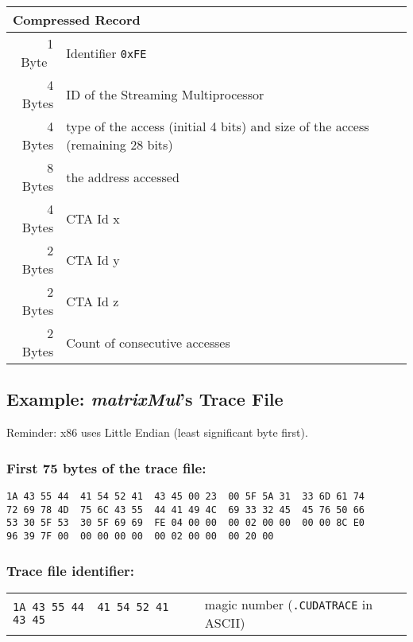 \documentclass{scrartcl}
\begin{document}
\bigskip

\begin{tabular}{r l}
\toprule
\multicolumn{2}{l}{\textbf{Compressed Record}} \\
\midrule
1 Byte~ & Identifier \lstinline[]$0xFE$ \\
4 Bytes & ID of the Streaming Multiprocessor \\
4 Bytes & type of the access (initial 4 bits) and size of the access (remaining 28 bits) \\
8 Bytes & the address accessed \\
4 Bytes & CTA Id x \\
2 Bytes & CTA Id y \\
2 Bytes & CTA Id z \\
2 Bytes & Count of consecutive accesses \\
\bottomrule
\end{tabular}


\newpage

\subsection{Example: \textit{matrixMul}’s Trace File}

Reminder: x86 uses Little Endian (least significant byte first).

\smallskip

\subsubsection*{First 75 bytes of the trace file:}
\begin{lstlisting}[numbers=none]
1A 43 55 44  41 54 52 41  43 45 00 23  00 5F 5A 31  33 6D 61 74
72 69 78 4D  75 6C 43 55  44 41 49 4C  69 33 32 45  45 76 50 66
53 30 5F 53  30 5F 69 69  FE 04 00 00  00 02 00 00  00 00 8C E0
96 39 7F 00  00 00 00 00  00 02 00 00  00 20 00
\end{lstlisting}

\bigskip

\subsubsection*{Trace file identifier:}
\begin{tabular}{l|l} 
\lstinline[]$1A 43 55 44  41 54 52 41  43 45$ & magic number (\lstinline[]$.CUDATRACE$ in ASCII)
\end{tabular}

\bigskip
\end{document}
